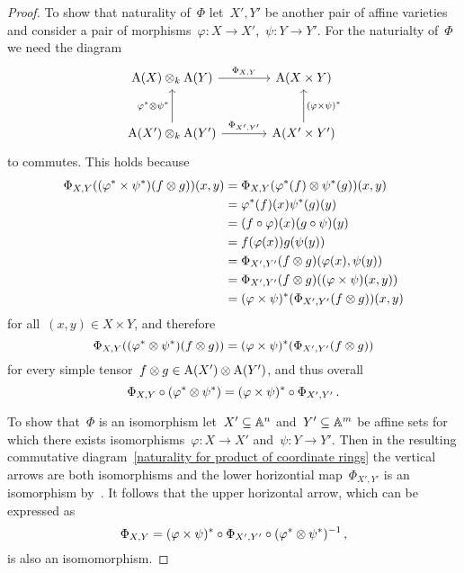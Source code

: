 \begin{proof}
  To show that naturality of~$\Phi$ let~$X', Y'$ be another pair of affine varieties and consider a pair of morphisms~$\varphi \colon X \to X'$,~$\psi \colon Y \to Y'$.
  For the naturialty of~$\Phi$ we need the diagram
  \begin{equation}
  \label{naturality for product of coordinate rings}
    \begin{tikzcd}[sep = large]
        \coord(X) \tensor_k \coord(Y)
        \arrow{r}[above]{\Phi_{X,Y}}
      & \coord(X \times Y)
      \\
        \coord(X') \tensor_k \coord(Y')
        \arrow{u}[left]{\varphi^* \tensor \psi^*}
        \arrow{r}[above]{\Phi_{X',Y'}}
      & \coord(X' \times Y')
        \arrow{u}[right]{(\varphi \times \psi)^*}
    \end{tikzcd}
  \end{equation}
  to commutes.
  This holds because
  \begin{align*}
        \Phi_{X,Y}( (\varphi^* \times \psi^*)(f \mathbin{\otimes} g) )(x,y)
    &=  \Phi_{X,Y}( \varphi^*(f) \mathbin{\otimes} \psi^*(g) )(x,y)         \\
    &=  \varphi^*(f)(x) \psi^*(g)(y)                              \\
    &=  (f \circ \varphi)(x) (g \circ \psi)(y)                    \\
    &=  f(\varphi(x)) g(\psi(y))                                  \\
    &=  \Phi_{X',Y'}(f \mathbin{\otimes} g)(\varphi(x), \psi(y))            \\
    &=  \Phi_{X',Y'}(f \mathbin{\otimes} g)( (\varphi \times \psi)(x,y) )   \\
    &=  (\varphi \times \psi)^*( \Phi_{X',Y'}(f \mathbin{\otimes} g) )(x,y)
  \end{align*}
  for all~$(x,y) \in X \times Y$, and therefore
  \[
      \Phi_{X,Y}( (\varphi^* \mathbin{\otimes} \psi^*)(f \mathbin{\otimes} g) )
    = (\varphi \times \psi)^*( \Phi_{X',Y'}(f \mathbin{\otimes} g ) )
  \]
  for every simple tensor~$f \mathbin{\otimes} g \in \operatorname{A}(X') \mathbin{\otimes} \operatorname{A}(Y')$, and thus overall
  \[
      \Phi_{X,Y} \circ (\varphi^* \mathbin{\otimes} \psi^*)
    = (\varphi \times \psi)^* \circ \Phi_{X',Y'} \,.
  \]

  
  To show that~$\Phi$ is an isomorphism let~$X' \subseteq \mathbb{A}^n$ and~$Y' \subseteq \mathbb{A}^m$ be affine sets for which there exists isomorphisms~$\varphi \colon X \to X'$ and~$\psi \colon Y \to Y'$.
  Then in the resulting commutative diagram~\eqref{naturality for product of coordinate rings} the vertical arrows are both isomorphisms and the lower horizontial map~$\Phi_{X', Y'}$ is an isomorphism by~.
  It follows that the upper horizontal arrow, which can be expressed as
  \begin{equation}
  \label{isomorphism for affine varieties}
      \Phi_{X,Y}
    = (\varphi \times \psi)^* \circ \Phi_{X',Y'} \circ ( \varphi^* \mathbin{\otimes} \psi^* )^{-1} \,,
  \end{equation}
  is also an isomomorphism.
\end{proof}


